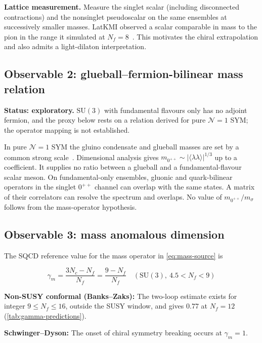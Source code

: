 \documentclass[11pt,a4paper]{article}
\theoremstyle{plain}
\theoremstyle{definition}
\theoremstyle{remark}
\newcommand{\Nc}{N_{\!c}}
\newcommand{\Nf}{N_{\!f}}
\newcommand{\SU}[1]{\mathrm{SU}(#1)}
\begin{document}
\textbf{Lattice measurement.}  Measure the singlet scalar (including
disconnected contractions) and the nonsinglet pseudoscalar on the
same ensembles at successively smaller masses.  LatKMI observed a
scalar comparable in mass to the pion in the range it simulated
at $\Nf=8$~\cite{LatKMI2014_Nf8,LatKMI2017_Nf8}.  This motivates the
chiral extrapolation and also admits a light-dilaton interpretation.

\subsection{Observable 2: glueball--fermion-bilinear mass relation}
\label{ssec:obs2}

\textbf{Status: exploratory.}  $\SU{3}$ with fundamental flavours only
has no adjoint fermion, and the proxy below rests on a relation derived
for pure $\mathcal{N}=1$ SYM; the operator mapping is not established.

In pure $\mathcal N=1$ SYM the gluino condensate and glueball masses
are set by a common strong scale~\cite{VY1982_spectrum}.  Dimensional
analysis gives $m_{0^{++}}\sim|\langle\lambda\lambda\rangle|^{1/3}$
up to a coefficient.  It supplies no ratio between a glueball and a
fundamental-flavour scalar meson.  On fundamental-only ensembles,
gluonic and quark-bilinear operators in the singlet $0^{++}$ channel
can overlap with the same states.  A matrix of their correlators can
resolve the spectrum and overlaps.  No value of $m_{0^{++}}/m_\sigma$
follows from the mass-operator hypothesis.

\subsection{Observable 3: mass anomalous dimension}
\label{ssec:obs3}

The SQCD reference value for the mass operator in \cref{eq:mass-source} is

\begin{equation}\label{eq:obs3-SUSY}
  \boxed{
    \gamma_m = \frac{3\Nc - \Nf}{\Nf}
    = \frac{9 - \Nf}{\Nf}\quad (\SU{3},\ 4.5 < \Nf < 9)
  }
\end{equation}

\textbf{Non-SUSY conformal (Banks--Zaks):}  The two-loop estimate
exists for integer $9\leq\Nf\leq16$, outside the SUSY window, and gives $0.77$ at
$\Nf = 12$ (\cref{tab:gamma-predictions}).

\textbf{Schwinger--Dyson:}  The onset of chiral symmetry breaking
occurs at $\gamma_m = 1$.
\end{document}
